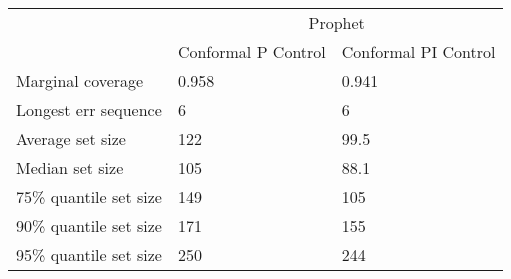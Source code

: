 \begin{tabular}{lll}
\toprule
& \multicolumn{2}{c}{Prophet} \\
& Conformal P Control & Conformal PI Control \\
\midrule
Marginal coverage & 0.958 & 0.941 \\
Longest err sequence & 6 & 6 \\
Average set size & 122 & 99.5 \\
Median set size & 105 & 88.1 \\
75\% quantile set size & 149 & 105 \\
90\% quantile set size & 171 & 155 \\
95\% quantile set size & 250 & 244 \\
\bottomrule
\end{tabular}
